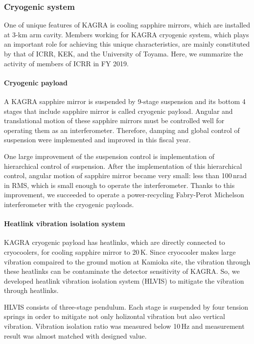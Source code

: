 \subsubsection*{\bf Cryogenic system}

\vspace{3pt}

One of unique features of KAGRA is cooling sapphire mirrors, which are installed at 3-km arm cavity. Members working for KAGRA cryogenic system, which plays an important role for achieving this unique characteristics, are mainly constituted by that of ICRR, KEK, and the University of Toyama. Here, we summarize the activity of members of ICRR in FY 2019.

\paragraph*{\bi Cryogenic payload}
A KAGRA sapphire mirror is suspended by 9-stage suspension and its bottom 4 stages that include sapphire mirror is called cryogenic payload. Angular and translational motion of these sapphire mirrors must be controlled well for operating them as an interferometer. Therefore, damping and global control of suspension were implemented and improved in this fiscal year.

One large improvement of the suspension control is implementation of hierarchical control of suspension. After the implementation of this hierarchical control, angular motion of sapphire mirror became very small: less than 100\,nrad in RMS, which is small enough to operate the interferometer. Thanks to this improvement, we succeeded to operate a power-recycling Fabry-Perot Michelson interferometer with the cryogenic payloads.

\paragraph*{\bi Heatlink vibration isolation system}
KAGRA cryogenic payload has heatlinks, which are directly connected to cryocoolers, for cooling sapphire mirror to 20\,K. Since cryocooler makes large vibration compaired to the ground motion at Kamioka site, the vibration through these heatlinks can be contaminate the detector sensitivity of KAGRA. So, we developed heatlink vibration isolation system (HLVIS) to mitigate the vibration through heatlinks.

HLVIS consists of three-stage pendulum. Each stage is suspended by four tension springs in order to mitigate not only holizontal vibration but also vertical vibration. Vibration isolation ratio was measured below 10\,Hz and measurement result was almost matched with designed value.

